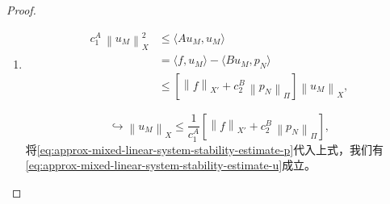 \begin{proof}
\begin{enumerate}
  \item
  \begin{equation*}
    \begin{split}
      c_{1}^{A} \, \left\| u_{M} \right\|_{X}^{2}
      & \le \langle A u_{M}, u_{M} \rangle \\
      & = \langle f, u_{M} \rangle - \langle B u_{M}, p_{N} \rangle \\
      & \le \left[
      \left\| f \right\|_{X'}
      + c_{2}^{B} \, \left\| p_{N} \right\|_{\Pi}
      \right]
      \left\| u_{M} \right\|_{X},
    \end{split}
  \end{equation*}

  \begin{equation*}
    \hookrightarrow \left\| u_{M} \right\|_{X} \le
    \frac{1}{c_{1}^{A}} \left[
    \left\| f \right\|_{X'} +
    c_{2}^{B} \, \left\| p_{N} \right\|_{\Pi}
    \right],
  \end{equation*}
  将\eqref{eq:approx-mixed-linear-system-stability-estimate-p}代入上式，我们有\eqref{eq:approx-mixed-linear-system-stability-estimate-u}成立。
  \end{enumerate}
\end{proof}

